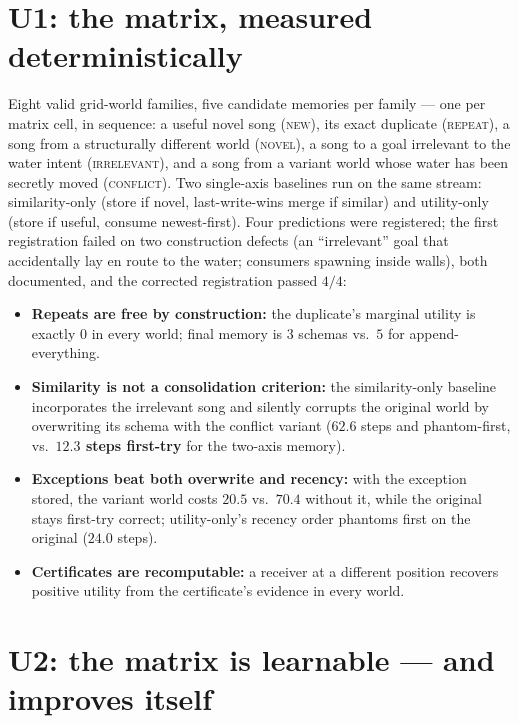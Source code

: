 \documentclass{article}
\begin{document}
\section{U1: the matrix, measured deterministically}
\label{sec:u1}

Eight valid grid-world families, five candidate memories per family
--- one per matrix cell, in sequence: a useful novel song
(\textsc{new}), its exact duplicate (\textsc{repeat}), a song from a
structurally different world (\textsc{novel}), a song to a goal
irrelevant to the water intent (\textsc{irrelevant}), and a song from
a variant world whose water has been secretly moved
(\textsc{conflict}). Two single-axis baselines run on the same
stream: similarity-only (store if novel, last-write-wins merge if
similar) and utility-only (store if useful, consume newest-first).
Four predictions were registered; the first registration failed on
two construction defects (an ``irrelevant'' goal that accidentally
lay en route to the water; consumers spawning inside walls), both
documented, and the corrected registration passed $4/4$:

\begin{itemize}[leftmargin=16pt,itemsep=2pt,topsep=2pt]
\item \textbf{Repeats are free by construction:} the duplicate's
  marginal utility is exactly $0$ in every world; final memory is
  $3$ schemas vs.\ $5$ for append-everything.
\item \textbf{Similarity is not a consolidation criterion:} the
  similarity-only baseline incorporates the irrelevant song and
  silently corrupts the original world by overwriting its schema with
  the conflict variant ($62.6$ steps and phantom-first, vs.\
  \textbf{$12.3$ steps first-try} for the two-axis memory).
\item \textbf{Exceptions beat both overwrite and recency:} with the
  exception stored, the variant world costs $20.5$ vs.\ $70.4$
  without it, while the original stays first-try correct;
  utility-only's recency order phantoms first on the original
  ($24.0$ steps).
\item \textbf{Certificates are recomputable:} a receiver at a
  different position recovers positive utility from the certificate's
  evidence in every world.
\end{itemize}

\section{U2: the matrix is learnable --- and improves itself}
\label{sec:u2}
\end{document}
